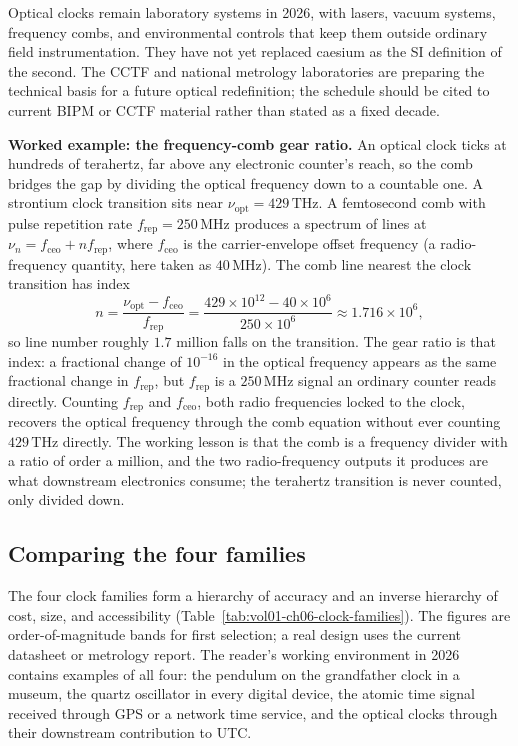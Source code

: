 Optical clocks remain laboratory systems in 2026, with lasers,
vacuum systems, frequency combs, and environmental controls that
keep them outside ordinary field instrumentation. They have not yet
replaced caesium as the SI definition of the second. The CCTF and
national metrology laboratories are preparing the technical basis
for a future optical redefinition; the schedule should be cited to
current BIPM or CCTF material rather than stated as a fixed decade.

\textbf{Worked example: the frequency-comb gear ratio.} An optical
clock ticks at hundreds of terahertz, far above any electronic
counter's reach, so the comb bridges the gap by dividing the optical
frequency down to a countable one. A strontium clock transition sits
near $\nu_{\text{opt}} = 429 \,\si{\tera\hertz}$. A femtosecond comb
with pulse repetition rate $f_{\text{rep}} = 250 \,\si{\mega\hertz}$
produces a spectrum of lines at $\nu_n = f_{\text{ceo}} + n
f_{\text{rep}}$, where $f_{\text{ceo}}$ is the carrier-envelope
offset frequency (a radio-frequency quantity, here taken as $40 \,\si
{\mega\hertz}$). The comb line nearest the clock transition has index
\[
n = \frac{\nu_{\text{opt}} - f_{\text{ceo}}}{f_{\text{rep}}}
= \frac{429 \times 10^{12} - 40 \times 10^{6}}{250 \times 10^{6}}
\approx 1.716 \times 10^{6},
\]
so line number roughly $1.7$ million falls on the transition. The
gear ratio is that index: a fractional change of $10^{-16}$ in the
optical frequency appears as the same fractional change in
$f_{\text{rep}}$, but $f_{\text{rep}}$ is a $250 \,\si{\mega\hertz}$
signal an ordinary counter reads directly. Counting $f_{\text{rep}}$
and $f_{\text{ceo}}$, both radio frequencies locked to the clock,
recovers the optical frequency through the comb equation without ever
counting $429 \,\si{\tera\hertz}$ directly. The working lesson is
that the comb is a frequency divider with a ratio of order a million,
and the two radio-frequency outputs it produces are what downstream
electronics consume; the terahertz transition is never counted, only
divided down.

\subsection{Comparing the four families}

The four clock families form a hierarchy of accuracy and an inverse
hierarchy of cost, size, and accessibility
(Table~\ref{tab:vol01-ch06-clock-families}). The figures are
order-of-magnitude bands for first selection; a real design uses
the current datasheet or metrology report. The reader's working
environment in 2026 contains examples of all four: the pendulum on
the grandfather clock in a museum, the quartz oscillator in every
digital device, the atomic time signal received through GPS or a
network time service, and the optical clocks through their
downstream contribution to UTC.

